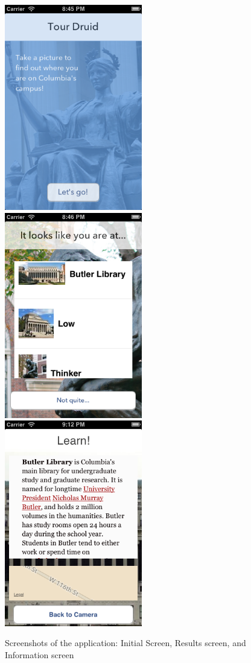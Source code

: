 \begin{figure}
\includegraphics[width=60mm]{app1.png}
\includegraphics[width=60mm]{app2.png}
\includegraphics[width=60mm]{app3.png}
\caption{Screenshots of the application: Initial Screen, Results screen, and Information screen}
\end{figure}
